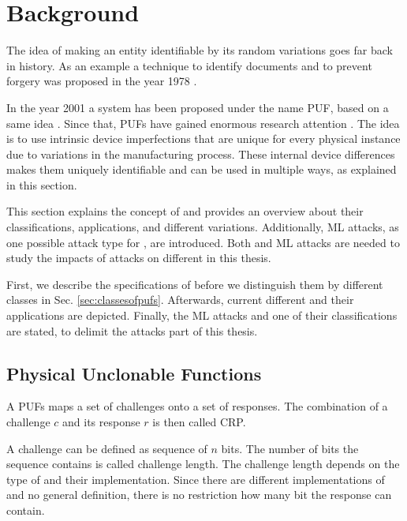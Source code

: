 \chapter{Background}
\label{cap:background}

The idea of making an entity identifiable by its random variations goes far back in history.
As an example a technique to identify documents and to prevent forgery was proposed in the year 1978 \cite{Brosow1980MethodForgery}.%

In the year 2001 a system has been proposed under the name \acf{PUF}, based on a same idea \cite{Pappu2001PhysicalFunctions}.
Since that, \acp{PUF} have gained enormous research attention \cite{Becker2015ThePUFs}. %
The idea is to use intrinsic device imperfections that are unique for every physical instance due to variations in the manufacturing process.
These internal device differences makes them uniquely identifiable and can be used in multiple ways, as explained in this section.

This section explains the concept of \pufs and provides an overview about their classifications, applications, and different variations.
Additionally, \ac{ML} attacks, as one possible attack type for \pufs, are introduced.
Both \pufs and \ac{ML} attacks are needed to study the impacts of attacks on different \pufs in this thesis. %

First, we describe the specifications of \pufs before we distinguish them by different classes in Sec. \ref{sec:classesofpufs}.
Afterwards, current different \pufs and their applications are depicted.
Finally, the \ac{ML} attacks and one of their classifications are stated, to delimit the attacks part of this thesis.


\section{Physical Unclonable Functions}
\label{sec:pyhsicalunclonablefunctions}

A \acfp{PUF} maps a set of challenges onto a set of responses.
The combination of a challenge $c$ and its response $r$ is then called \ac{CRP}. %

A challenge can be defined as sequence of $n$ bits.
The number of bits the sequence contains is called challenge length. %
The challenge length depends on the type of \puf and their implementation.
Since there are different implementations of \pufs and no general definition, there is no restriction how many bit the response can contain. %

